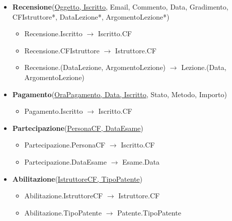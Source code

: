 \documentclass[10pt,twoside]{article}
\begin{document}
{{\begin{itemize}
            \item \textbf{Recensione}(\underline{Oggetto, Iscritto}, Email, Commento, Data, Gradimento, CFIstruttore*, DataLezione*, ArgomentoLezione*)
            \begin{itemize}
                \item Recensione.Iscritto $\rightarrow$ Iscritto.CF
                \item Recensione.CFIstruttore $\rightarrow$ Istruttore.CF
                \item Recensione.(DataLezione, ArgomentoLezione) $\rightarrow$ Lezione.(Data, ArgomentoLezione)
            \end{itemize}
            \item \textbf{Pagamento}(\underline{OraPagamento, Data, Iscritto}, Stato, Metodo, Importo)
            \begin{itemize}
                \item Pagamento.Iscritto $\rightarrow$ Iscritto.CF
            \end{itemize}
            \item \textbf{Partecipazione}(\underline{PersonaCF, DataEsame})
            \begin{itemize}
                \item Partecipazione.PersonaCF $\rightarrow$ Iscritto.CF
                \item Partecipazione.DataEsame $\rightarrow$ Esame.Data
            \end{itemize}
            \item \textbf{Abilitazione}(\underline{IstruttoreCF, TipoPatente})
            \begin{itemize}
                \item Abilitazione.IstruttoreCF $\rightarrow$ Istruttore.CF
                \item Abilitazione.TipoPatente $\rightarrow$ Patente.TipoPatente
            \end{itemize}
        \end{itemize}
    }
}
\end{document}
